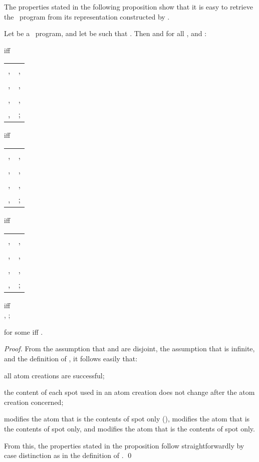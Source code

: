 \documentclass[fleqn]{llncs}
\begin{document}
The properties stated in the following proposition show that it is easy
to retrieve the \PGLD\ program  from its representation constructed by
.
\begin{proposition}
\label{prop-representation}
Let  be a \PGLD\ program, and
let  be such that
.
Then  and
for all ,  and :
\begin{iteml}
\normalfont
\item
 iff \\ 
\begin{tabular}[t]{@{}ll@{}}
, &
, \\
, &
, \\
, &
, \\
, &
;
\end{tabular}
\item
 iff \\ 
\begin{tabular}[t]{@{}ll@{}}
, &
, \\
, &
, \\
, &
, \\
, &
;
\end{tabular}
\item
 iff \\ 
\begin{tabular}[t]{@{}ll@{}}
, &
, \\
, &
, \\
, &
, \\
, &
;
\end{tabular}
\item
 iff \\ 
,
;
\item
 for some  iff
.
\end{iteml}
\end{proposition}
\begin{proof}
From the assumption that  and  are disjoint, the assumption
that  is infinite, and the definition of , it follows
easily that:
\begin{iteml}
\item
all atom creations are successful;
\item
the content of each spot used in an atom creation does not change after
the atom creation concerned;
\item
 modifies the atom that is the contents of spot  only
(),
 modifies the atom that is the contents of
spot  only, and
 modifies the atom that is the contents of
spot  only.
\end{iteml}
From this, the properties stated in the proposition follow
straightforwardly by case distinction as in the definition of .
\qed
\end{proof}
\end{document}
